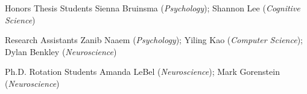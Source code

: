 
\begin{cvskills}

  \cvskill
    {Honors Thesis Students}
    {Sienna Bruinsma (\textit{Psychology}); Shannon Lee (\textit{Cognitive Science})} %
    
  \cvskill
  	{Research Assistants}
    {Zanib Naaem (\textit{Psychology}); Yiling Kao (\textit{Computer Science}); Dylan Benkley (\textit{Neuroscience})} %
    
  \cvskill
  	{Ph.D. Rotation Students}
    {Amanda LeBel (\textit{Neuroscience}); Mark Gorenstein (\textit{Neuroscience})}
    
\end{cvskills}
